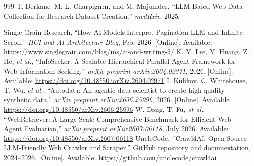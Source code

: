 \documentclass[12pt,oneside]{report}
\begin{document}
\begin{thebibliography}{999}
 T. Berkane, M.-L. Charpignon, and M. Majumder, ``LLM-Based Web Data Collection for Research Dataset Creation,'' \textit{medRxiv}, 2025.

 Single Grain Research, ``How AI Models Interpret Pagination LLM and Infinite Scroll,'' \textit{HCI and AI Architecture Blog}, Feb. 2026. [Online]. Available: \url{https://www.singlegrain.com/blog/ms/ai-and-writing-5/}
 K. Y. Lee, Y. Huang, Z. He, \textit{et al.}, ``InfoSeeker: A Scalable Hierarchical Parallel Agent Framework for Web Information Seeking,'' \textit{arXiv preprint arXiv:2604.02971}, 2026. [Online]. Available: \url{https://doi.org/10.48550/arXiv.2604.02971}
 I. Kulikov, C. Whitehouse, T. Wu, \textit{et al.}, ``Autodata: An agentic data scientist to create high quality synthetic data,'' \textit{arXiv preprint arXiv:2606.25996}, 2026. [Online]. Available: \url{https://doi.org/10.48550/arXiv.2606.25996}
 W. Dong, T. Fu, \textit{et al.}, ``WebRetriever: A Large-Scale Comprehensive Benchmark for Efficient Web Agent Evaluation,'' \textit{arXiv preprint arXiv:2607.06118}, July 2026. Available: \url{https://doi.org/10.48550/arXiv.2607.06118}
 UncleCode, ``Crawl4AI: Open-Source LLM-Friendly Web Crawler and Scraper,'' GitHub repository and documentation, 2024--2026. [Online]. Available: \url{https://github.com/unclecode/crawl4ai}

\end{thebibliography}
\end{document}
